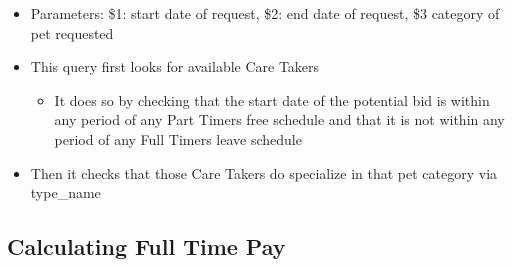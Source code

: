 \documentclass[
  paper=a4,
  ,captions=tableheading
]{scrartcl}
\providecommand{\tightlist}{%
  \setlength{\itemsep}{0pt}\setlength{\parskip}{0pt}}
\begin{document}
\begin{itemize}
\tightlist
\item
  Parameters: \$1: start date of request, \$2: end date of request, \$3
  category of pet requested
\item
  This query first looks for available Care Takers

  \begin{itemize}
  \tightlist
  \item
    It does so by checking that the start date of the potential bid is
    within any period of any Part Timers free schedule and that it is
    not within any period of any Full Timers leave schedule
  \end{itemize}
\item
  Then it checks that those Care Takers do specialize in that pet
  category via type\_name
\end{itemize}

\hypertarget{calculating-full-time-pay}{%
\subsection{Calculating Full Time Pay}\label{calculating-full-time-pay}}
\end{document}
